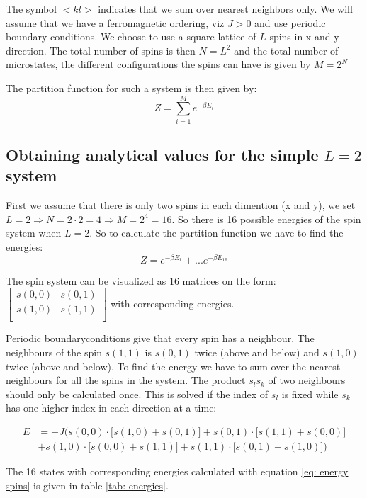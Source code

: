 \documentclass[11pt,a4wide]{article}
\begin{document}
The symbol $<kl>$ indicates that we sum over nearest neighbors only. We will assume that we have a ferromagnetic ordering, viz $J> 0$ and use periodic boundary conditions. We choose to use a square lattice of $L$ spins in x and y direction. The total number of spins is then $N = L^2$ and the total number of microstates, the different configurations the spins can have is given by $M=2^N$

The partition function for such a system is then given by:
\[
Z = \sum_{i=1}^M e^{-\beta E_i}
\]

\subsection{Obtaining analytical values for the simple $L=2$ system} \label{sec:theory_L2}
First we assume that there is only two spins in each dimention (x and y), we set $L=2 \Rightarrow N = 2\cdot 2 = 4\Rightarrow M= 2^4 = 16$. So there is 16 possible energies of the spin system when $L=2$. So to calculate the partition function we have to find the energies:
\[
Z = e^{-\beta E_1} + ... e^{-\beta E_{16}}
\]

The spin system can be visualized as 16 matrices on the form:
$\left[ \begin{array}{cc} s(0,0) & s(0,1) \\
                             	    s(1,0)  & s(1,1) \\
\end{array} \right]$
with corresponding energies. 

Periodic boundaryconditions give that every spin has a neighbour. The neighbours of the spin $s(1,1)$ is  $s(0,1)$ twice (above and below) and $s(1,0)$ twice (above and below). To find the energy we have to sum over the nearest neighbours for all the spins in the system. The product $s_ls_k$ of two neighbours should only be calculated once. This is solved if the index of $s_l$ is fixed while $s_k$ has one higher index in each direction at a time:

\begin{align}
E &= -J\bigg( s(0,0)\cdot \big[s(1,0) + s(0,1) \big] + s(0,1)\cdot\big[s(1,1) + s(0,0) \big] \nonumber   \\ 
 &+ s(1,0)\cdot\big[s(0,0) + s(1,1) \big] + s(1,1)\cdot\big[s(0,1) + s(1,0) \big] \bigg)
 \label{eq: energy spins}
\end{align}

The 16 states with corresponding energies calculated with equation \ref{eq: energy spins} is given in table \ref{tab: energies}.
\end{document}
